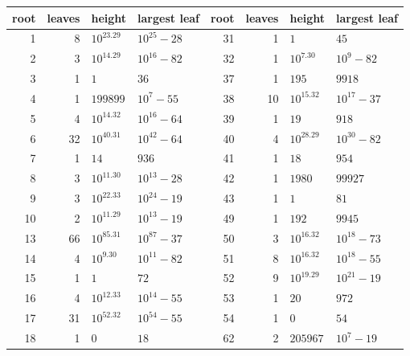 \begin{center}
  \small
  \begin{tabular}{@{}rrll@{\qquad}rrll@{}}
    \toprule
    root & leaves & height       & largest leaf     & root & leaves & height        & largest leaf    \\
    \midrule
       1 &      8 & $10^{23.29}$  & $10^{25} - 28$  &   31 &      1 & $1$           & $45$            \\
       2 &      3 & $10^{14.29}$  & $10^{16} - 82$  &   32 &      1 & $10^{7.30}$   & $10^{9} - 82$   \\
       3 &      1 & $1$           & $36$            &   37 &      1 & $195$         & $9918$          \\
       4 &      1 & $199899$      & $10^{7} - 55$   &   38 &     10 & $10^{15.32}$  & $10^{17} - 37$  \\
       5 &      4 & $10^{14.32}$  & $10^{16} - 64$  &   39 &      1 & $19$          & $918$           \\
       6 &     32 & $10^{40.31}$  & $10^{42} - 64$  &   40 &      4 & $10^{28.29}$  & $10^{30} - 82$  \\
       7 &      1 & $14$          & $936$           &   41 &      1 & $18$          & $954$           \\
       8 &      3 & $10^{11.30}$  & $10^{13} - 28$  &   42 &      1 & $1980$        & $99927$         \\
       9 &      3 & $10^{22.33}$  & $10^{24} - 19$  &   43 &      1 & $1$           & $81$            \\
      10 &      2 & $10^{11.29}$  & $10^{13} - 19$  &   49 &      1 & $192$         & $9945$          \\
      13 &     66 & $10^{85.31}$  & $10^{87} - 37$  &   50 &      3 & $10^{16.32}$  & $10^{18} - 73$  \\
      14 &      4 & $10^{9.30}$   & $10^{11} - 82$  &   51 &      8 & $10^{16.32}$  & $10^{18} - 55$  \\
      15 &      1 & $1$           & $72$            &   52 &      9 & $10^{19.29}$  & $10^{21} - 19$  \\
      16 &      4 & $10^{12.33}$  & $10^{14} - 55$  &   53 &      1 & $20$          & $972$           \\
      17 &     31 & $10^{52.32}$  & $10^{54} - 55$  &   54 &      1 & $0$           & $54$            \\
      18 &      1 & $0$           & $18$            &   62 &      2 & $205967$      & $10^{7} - 19$   \\

\end{tabular}
\end{center}
